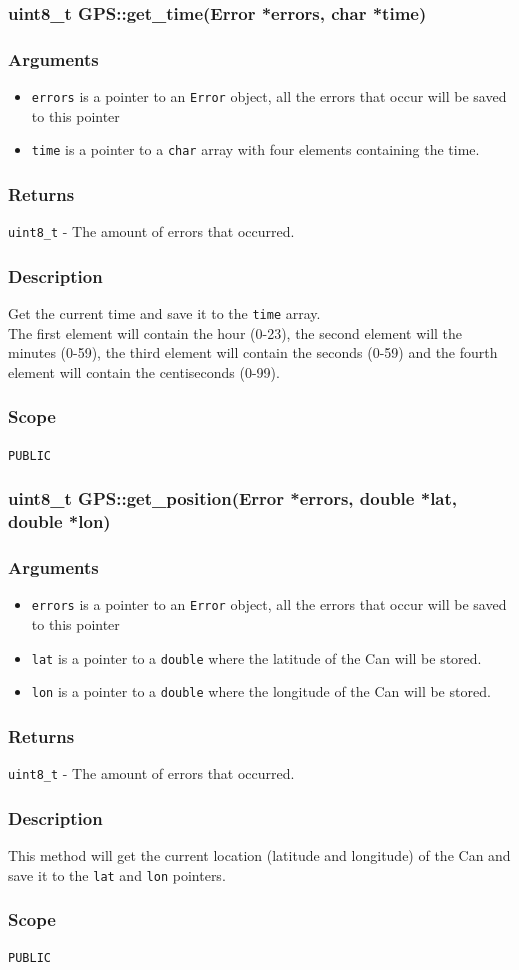 \documentclass[a4paper,10pt]{article}
\newcommand{\errorsarg}{\item \texttt{errors} is a pointer to an \texttt{Error} object, all the errors that occur will be saved to this pointer}
\newcommand{\amountoferrorsret}{\texttt{uint8\_t} - The amount of errors that occurred. }
\newcommand{\func}[1]{\texttt{#1}}
\newenvironment{method}[2]{%
	\newcommand\funname{\func{#1}}
	\subsubsection[#1]{#2}
	
	\newenvironment{methodargs}{%
		\subsubsection*{Arguments}
	}{}
	
	\newenvironment{methodreturns}{%
		\subsubsection*{Returns}
	}{}
	
	\newenvironment{methoddesc}{%
		\subsubsection*{Description}
	}{}

	\newenvironment{methodscope}{
		\subsubsection*{Scope}
	}{}
}{}
\begin{document}
			\begin{method}{get\_time}{uint8\_t GPS::get\_time(Error *errors, char *time)}
				\begin{methodargs}
					\begin{itemize}
						\errorsarg
						\item \texttt{time} is a pointer to a \texttt{char} array with four elements containing the time. 
					\end{itemize}
				\end{methodargs}
				
				\begin{methodreturns}
					\amountoferrorsret
				\end{methodreturns}
			
				\begin{methoddesc}
					Get the current time and save it to the \texttt{time} array. \\ 
					The first element will contain the hour (0-23), the second element will the minutes (0-59), the third element will contain the seconds (0-59) and the fourth element will contain the centiseconds (0-99). 
				\end{methoddesc}
			
				\begin{methodscope}
					\texttt{PUBLIC}
				\end{methodscope}
			\end{method}
		
			\begin{method}{get\_position}{uint8\_t GPS::get\_position(Error *errors, double *lat, double *lon)}
				\begin{methodargs}
					\begin{itemize}
						\errorsarg
						\item \texttt{lat} is a pointer to a \texttt{double} where the latitude of the Can will be stored. 
						\item \texttt{lon} is a pointer to a \texttt{double} where the longitude of the Can will be stored. 
					\end{itemize}
				\end{methodargs}
			
				\begin{methodreturns}
					\amountoferrorsret
				\end{methodreturns}
			
				\begin{methoddesc}
					This method will get the current location (latitude and longitude) of the Can and save it to the \texttt{lat} and \texttt{lon} pointers. 
				\end{methoddesc}
			
				\begin{methodscope}
					\texttt{PUBLIC}
				\end{methodscope}
			\end{method}
		
\end{document}
